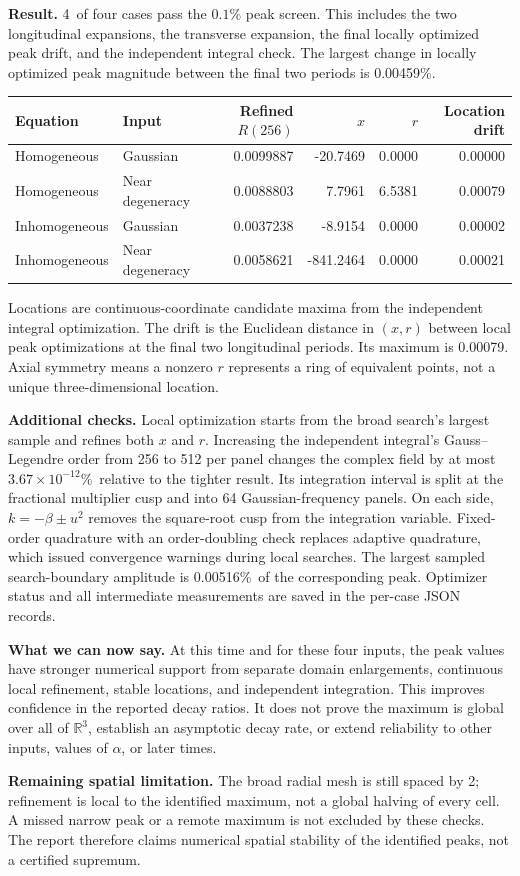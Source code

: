 \documentclass[10pt,letterpaper]{article}
\numberwithin{equation}{section}
\newcommand{\SpatialLocations}{Homogeneous & Gaussian & 0.0099887 & -20.7469 & 0.0000 & 0.00000 \\
Homogeneous & Near degeneracy & 0.0088803 & 7.7961 & 6.5381 & 0.00079 \\
Inhomogeneous & Gaussian & 0.0037238 & -8.9154 & 0.0000 & 0.00002 \\
Inhomogeneous & Near degeneracy & 0.0058621 & -841.2464 & 0.0000 & 0.00021 \\}
\newcommand{\SpatialLocationDrift}{0.00079}
\newcommand{\SpatialPeakDrift}{0.00459\%}
\newcommand{\SpatialQuadTighten}{$3.67\times10^{-12}\%$}
\newcommand{\SpatialBoundary}{0.00516\%}
\newcommand{\SpatialPassed}{4}
\begin{document}
\textbf{Result.} \SpatialPassed\ of four cases pass the $0.1\%$ peak screen.
This includes the two longitudinal expansions, the transverse expansion, the
final locally optimized peak drift, and the independent integral check.
The largest change in locally optimized peak magnitude between the final two
periods is \SpatialPeakDrift.

\begin{center}\small
\begin{tabular}{llrrrr}\toprule
Equation & Input & Refined $R(256)$ & $x$ & $r$ & Location drift\\\midrule
\SpatialLocations
\bottomrule\end{tabular}\end{center}
Locations are continuous-coordinate candidate maxima from the independent
integral optimization. The drift is the Euclidean distance in $(x,r)$ between
local peak optimizations at the final two longitudinal periods. Its maximum is
\SpatialLocationDrift. Axial symmetry means a nonzero $r$ represents a ring of
equivalent points, not a unique three-dimensional location.

\textbf{Additional checks.} Local optimization starts from the broad search's
largest sample and refines both $x$ and $r$. Increasing the independent
integral's Gauss--Legendre order from 256 to 512 per panel changes the complex field by
at most \SpatialQuadTighten\ relative to the tighter result. Its integration
interval is split at the fractional multiplier cusp and into 64 Gaussian-frequency
panels. On each side, $k=-\beta\pm u^2$ removes the square-root cusp from the
integration variable. Fixed-order quadrature with an order-doubling check replaces
adaptive quadrature, which issued convergence warnings during local searches.
The largest sampled search-boundary amplitude is \SpatialBoundary\ of
the corresponding peak. Optimizer status and all intermediate measurements are
saved in the per-case JSON records.

\textbf{What we can now say.} At this time and for these four inputs, the peak
values have stronger numerical support from separate domain enlargements,
continuous local refinement, stable locations, and independent integration.
This improves confidence in the reported decay ratios. It does not prove the
maximum is global over all of $\mathbb R^3$, establish an asymptotic decay rate,
or extend reliability to other inputs, values of $\alpha$, or later times.

\textbf{Remaining spatial limitation.} The broad radial mesh is still spaced by
2; refinement is local to the identified maximum, not a global halving of every
cell. A missed narrow peak or a remote maximum is not excluded by these checks.
The report therefore claims numerical spatial stability of the identified peaks,
not a certified supremum.
\end{document}
